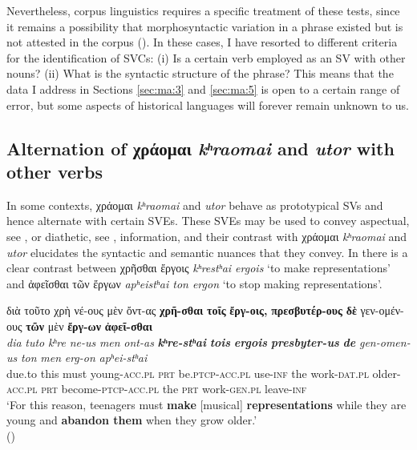 \documentclass[output=paper,colorlinks,citecolor=brown]{langscibook}
\begin{document}
\z

\z


Nevertheless, corpus linguistics requires a specific treatment of these tests, since it
remains a possibility that morphosyntactic variation in a phrase existed but is not
attested in the corpus (\cite{herring_methodologies_2000}). In these cases, I have
resorted to different criteria for the identification of SVCs: (i) Is a certain verb
employed as an SV with other nouns? (ii) What is the syntactic structure of the phrase?
This means that the data I address in Sections \ref{sec:ma:3} and \ref{sec:ma:5} is open
to a certain range of error, but some aspects of historical languages will forever remain
unknown to us.





\subsection{Alternation of χράομαι \emph{kʰraomai} and \emph{utor} with other
  verbs}\label{sec:ma:4:3}

In some contexts, χράομαι \emph{kʰraomai} and \emph{utor} behave as
prototypical SVs and hence alternate with certain SVEs. These
SVEs may be used to convey aspectual, see , or diathetic, see
, information, and their contrast with χράομαι \emph{kʰraomai} and \emph{utor}
elucidates the syntactic and semantic nuances that they convey. In  there is a
clear contrast between χρῆσθαι ἔργοις \emph{kʰrestʰai
  ergois} `to make representations' and ἀφεῖσθαι τῶν ἔργων
\emph{apʰeistʰai ton ergon} `to stop making
representations'.



\ea\label{ex:ma:5}

\glll διὰ τοῦτο χρὴ νέ-ους μὲν ὄντ-ας \textbf{χρῆ-σθαι} \textbf{τοῖς} \textbf{ἔργ-οις,} \textbf{πρεσβυτέρ-ους} \textbf{δὲ} γεν-ομέν-ους \textbf{τῶν} μὲν \textbf{ἔργ-ων} \textbf{ἀφεῖ-σθαι}\\
 \textit{dia} \textit{tuto} \textit{kʰre} \textit{ne-us} \textit{men} \textit{ont-as}
\textit{\textbf{kʰre-stʰai}} \textit{\textbf{tois}} \textit{\textbf{ergois}} \textit{\textbf{presbyter-us}} \textit{\textbf{de}} \textit{gen-omen-us} \textit{ton} \textit{men} \textit{erg-on} \textit{apʰei-stʰai}\\
due.to this must young-\textsc{acc.pl} \textsc{prt} be.\textsc{ptcp}-\textsc{acc.pl} use-\textsc{inf} the work-\textsc{dat.pl} older-\textsc{acc.pl} \textsc{prt}
become-\textsc{ptcp-acc.pl} the \textsc{prt} work-\textsc{gen.pl} leave-\textsc{inf}\\
\glt `For this reason, teenagers must \textbf{make} {[}musical{]} \textbf{representations} while they are young and \textbf{abandon them} when they grow older.' \\
\hspace*{\fill}()
\end{document}

